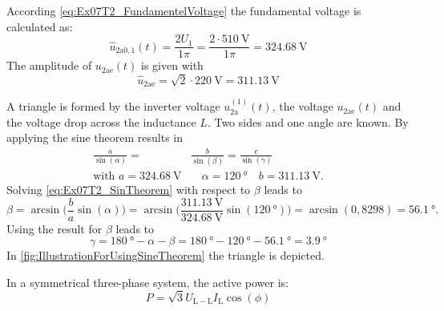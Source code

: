 \begin{solutionblock}
    According \eqref{eq:Ex07T2_FundamentelVoltage} the fundamental voltage  is calculated as:
    \begin{equation}
        \hat{u}_\mathrm{2a0,1}(t)=\frac{2U_{\mathrm{1}}}{1\pi}=\frac{2\cdot \SI{510}{\volt}}{1\pi}=\SI{324,68}{\volt}
    \end{equation}
    The amplitude of $u_\mathrm{2ae}(t)$ is given with
    \begin{equation}
        \hat{u}_\mathrm{2ae}=\sqrt{2} \cdot \SI{220}{\volt}=\SI{311,13}{\volt}
    \end{equation}

    A triangle is formed by the inverter voltage $u_\mathrm{2a}^\mathrm{(1)}(t)$, the voltage $u_\mathrm{2ae}(t)$ 
    and the voltage drop across the inductance $L$. Two sides and one angle are known. By applying the sine theorem results in
    \begin{equation}
        \begin{split}        
            \frac{a}{\sin(\alpha)} = &\frac{b}{\sin(\beta)} = \frac{c}{\sin(\gamma)} \\
            \text{with } a=\SI{324,68}{\volt} &\quad \alpha=\SI{120}{\degree} \quad b=\SI{311,13}{\volt}.
            \label{eq:Ex07T2_SinTheorem}
        \end{split}                 
    \end{equation}   
    Solving \eqref{eq:Ex07T2_SinTheorem} with respect to $\beta$ leads to
    \begin{equation}
        \beta=\arcsin\big(\frac{b}{a}\sin(\alpha)\big) 
        =\arcsin\big(\frac{\SI{311,13}{\volt}}{\SI{324,68}{\volt}}\sin(\SI{120}{\degree})\big) = \arcsin(0,8298)=\SI{56.1}{\degree}.
        \label{eq:Ex07T2_sin_beta}
    \end{equation}
    Using the result for $\beta$ leads to
    \begin{equation}
        \gamma=\SI{180}{\degree}-\alpha-\beta = \SI{180}{\degree}-\SI{120}{\degree}-\SI{56.1}{\degree}= \SI{3.9}{\degree}
        \label{eq:Ex07T2_sin_beta}
    \end{equation}
    In \autoref{fig:IllustrationForUsingSineTheorem} the triangle is depicted.
    
    In a symmetrical three-phase system, the active power is:
    \begin{equation}
        P=\sqrt{3} U_{\mathrm{L-L}} I_{\mathrm{L}} \cos(\phi)
        \label{eq:Ex07T2_EffPowergen}
    \end{equation}


\end{solutionblock}
